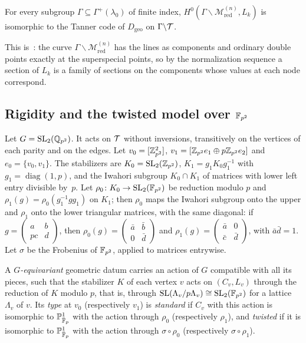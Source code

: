 \begin{lemma}\label{lem:sections}
\notformalized
For every subgroup $\Gamma\subseteq\Gamma^+(\lambda_0)$ of finite index, $H^0(\Gamma\backslash\mathcal M^{(n)}_{\mathrm{red}},L_k)$
is isomorphic to the Tanner code of $D_{\mathrm{geo}}$ on $\Gamma\backslash\mathcal{T}$.
\end{lemma}
\begin{informalproof}
This is~\cite[Lemma~6.7]{Luck2026}: the curve $\Gamma\backslash\mathcal M^{(n)}_{\mathrm{red}}$ has the lines as
components and ordinary double points exactly at the superspecial points, so by the normalization sequence a section of
$L_k$ is a family of sections on the components whose values at each node correspond.
\end{informalproof}

\subsection{Rigidity and the twisted model over \texorpdfstring{$\mathbb{F}_{p^2}$}{F\_{p\textasciicircum2}}}\label{sec:arith-rigid}

Let $G=\operatorname{SL}_2(\mathbb{Q}_{p^2})$. It acts on $\mathcal{T}$ without inversions, transitively on the vertices of each parity and on the
edges. Let $v_0=[\mathbb{Z}_{p^2}^2]$, $v_1=[\mathbb{Z}_{p^2}e_1\oplus p\mathbb{Z}_{p^2}e_2]$ and $e_0=\{v_0,v_1\}$. The
stabilizers are $K_0=\operatorname{SL}_2(\mathbb{Z}_{p^2})$, $K_1=g_1K_0g_1^{-1}$ with $g_1=\operatorname{diag}(1,p)$, and the Iwahori subgroup
$K_0\cap K_1$ of matrices with lower left entry divisible by~$p$. Let $\rho_0\colon K_0\to\operatorname{SL}_2(\mathbb{F}_{p^2})$ be reduction modulo
$p$ and $\rho_1(g)=\rho_0(g_1^{-1}gg_1)$ on $K_1$; then $\rho_0$ maps the Iwahori subgroup onto the upper and $\rho_1$ onto
the lower triangular matrices, with the same diagonal: if $g=(\begin{smallmatrix}a&b\\pc&d\end{smallmatrix})$, then
$\rho_0(g)=(\begin{smallmatrix}\bar a&\bar b\\0&\bar d\end{smallmatrix})$ and
$\rho_1(g)=(\begin{smallmatrix}\bar a&0\\\bar c&\bar d\end{smallmatrix})$, with $\bar a\bar d=1$. Let $\sigma$ be the Frobenius
of $\mathbb{F}_{p^2}$, applied to matrices entrywise.

A \emph{$G$-equivariant} geometric datum carries an action of $G$ compatible with all its pieces, such that the stabilizer
$K$ of each vertex $v$ acts on $(C_v,L_v)$ through the reduction of $K$ modulo $p$, that is, through
$\operatorname{SL}(\Lambda_v/p\Lambda_v)\cong\operatorname{SL}_2(\mathbb{F}_{p^2})$ for a lattice $\Lambda_v$ of $v$. Its \emph{type} at $v_0$ (respectively
$v_1$) is \emph{standard} if $C_v$ with this action is isomorphic to $\mathbb{P}^1_{\bar{\mathbb{F}}_p}$ with the action through $\rho_0$
(respectively $\rho_1$), and \emph{twisted} if it is isomorphic to $\mathbb{P}^1_{\bar{\mathbb{F}}_p}$ with the action through
$\sigma\circ\rho_0$ (respectively $\sigma\circ\rho_1$).

